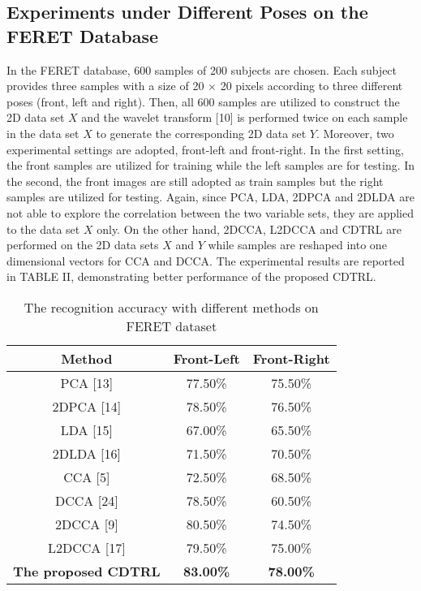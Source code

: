 \documentclass[journal]{IEEEtran}
\begin{document}
\subsection{Experiments under Different Poses on the FERET Database}
In the FERET database, 600 samples of 200 subjects are chosen. Each subject provides three samples with a size of 20 $\times$ 20 pixels according to three different poses (front, left and right). Then, all 600 samples are utilized to construct the 2D data set $X$ and the wavelet transform [10] is performed twice on each sample in the data set $X$ to generate the corresponding 2D data set $Y$. Moreover, two experimental settings are adopted, front-left and front-right. In the first setting, the front samples are utilized for training while the left samples are for testing. In the second, the front images are still adopted as train samples but the right samples are utilized for testing. Again, since PCA, LDA, 2DPCA and 2DLDA are not able to explore the correlation between the two variable sets, they are applied to the data set $X$ only. On the other hand, 2DCCA, L2DCCA and CDTRL are performed on the 2D data sets $X$ and $Y$ while samples are reshaped into one dimensional vectors for CCA and DCCA. The experimental results are reported in TABLE II, demonstrating better performance of the proposed CDTRL.\\
\vspace*{-10pt}
\begin{table}[h]
\normalsize
\renewcommand{\arraystretch}{0.8}
\caption{\normalsize{The recognition accuracy with different methods on FERET dataset}}
\setlength{\abovecaptionskip}{0pt}
\setlength{\belowcaptionskip}{10pt}
\centering
\tabcolsep 0.1in
\begin{tabular}{ccc}
\hline
\hline
Method & Front-Left & Front-Right \\
\hline
PCA [13]  &77.50\% &75.50\% \\
2DPCA [14]  &78.50\% &76.50\% \\
LDA [15] &67.00\% &65.50\% \\
2DLDA [16] &71.50\% &70.50\% \\
CCA [5] &72.50\% &68.50\% \\
DCCA [24]  &78.50\% &60.50\% \\
2DCCA [9]  &80.50\% &74.50\%\\
L2DCCA [17]  &79.50\% &75.00\%\\
\textbf{The proposed CDTRL}  &\textbf{83.00\%} &\textbf{78.00\%}\\
\hline
\hline
\end{tabular}
\end{table}
\end{document}
